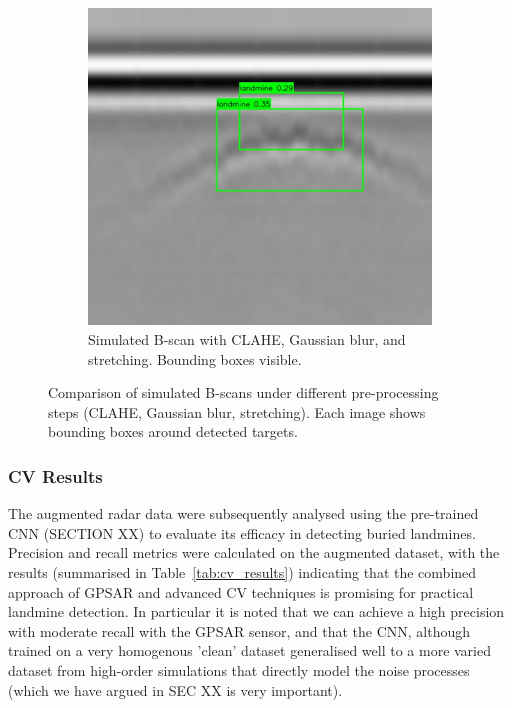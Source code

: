 \begin{figure}[htbp]
\begin{subfigure}[b]{0.32\textwidth}
                \includegraphics[width=\textwidth]{figs/Rory/sim_bscan_clahe_detection_blur_stretched_cropped.png}
                \caption{Simulated B-scan with CLAHE, Gaussian blur, and stretching. Bounding boxes visible.}
                \label{fig:bscan_blur_stretched}
            \end{subfigure}
            
            \caption{Comparison of simulated B-scans under different pre-processing steps (CLAHE, Gaussian blur, stretching). Each image shows bounding boxes around detected targets.}
            \label{fig:sim_bscan_comparison}
        \end{figure}
        
    
    \subsubsection{CV Results}
    
        The augmented radar data were subsequently analysed using the pre-trained CNN (SECTION XX) to evaluate its efficacy in detecting buried landmines. Precision and recall metrics were calculated on the augmented dataset, with the results (summarised in Table~\ref{tab:cv_results}) indicating that the combined approach of GPSAR and advanced CV techniques is promising for practical landmine detection. In particular it is noted that we can achieve a high precision with moderate recall with the GPSAR sensor, and that the CNN, although trained on a very homogenous 'clean' dataset generalised well to a more varied dataset from high-order simulations that directly model the noise processes (which we have argued in SEC XX is very important).
        
